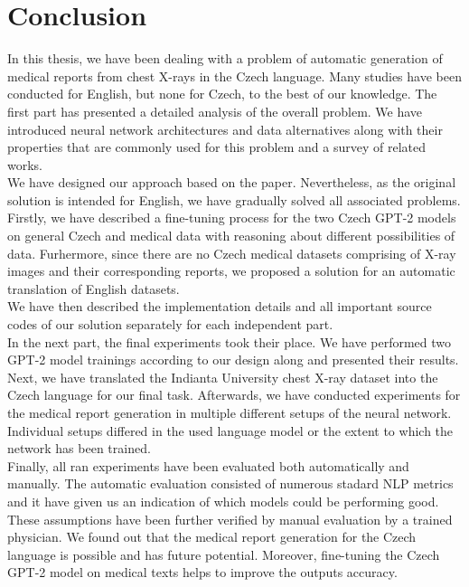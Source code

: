 \chapter*{Conclusion}

In this thesis, we have been dealing with a problem of automatic generation of medical reports from chest X-rays in the Czech language. Many studies have been conducted for English, but none for Czech, to the best of our knowledge. The first part has presented a detailed analysis of the overall problem. We have introduced neural network architectures and data alternatives along with their properties that are commonly used for this problem and a survey of related works.\\

We have designed our approach based on the \citet{alfarghaly2021automated} paper. Nevertheless, as the original solution is intended for English, we have gradually solved all associated problems. Firstly, we have described a fine-tuning process for the two Czech GPT-2 models on general Czech and medical data with reasoning about different possibilities of data. Furhermore, since there are no Czech medical datasets comprising of X-ray images and their corresponding reports, we proposed a solution for an automatic translation of English datasets. \\

We have then described the implementation details and all important source codes of our solution separately for each independent part.\\

In the next part, the final experiments took their place. We have performed two GPT-2 model trainings according to our design along and presented their results. Next, we have translated the Indianta University chest X-ray dataset into the Czech language for our final task. Afterwards, we have conducted experiments for the medical report generation in multiple different setups of the neural network. Individual setups differed in the used language model or the extent to which the network has been trained.\\

Finally, all ran experiments have been evaluated both automatically and manually. The automatic evaluation consisted of numerous stadard NLP metrics and it have given us an indication of which models could be performing good. These assumptions have been further verified by manual evaluation by a trained physician. We found out that the medical report generation for the Czech language is possible and has future potential. Moreover, fine-tuning the Czech GPT-2 model on medical texts helps to improve the outputs accuracy.
\newpage

